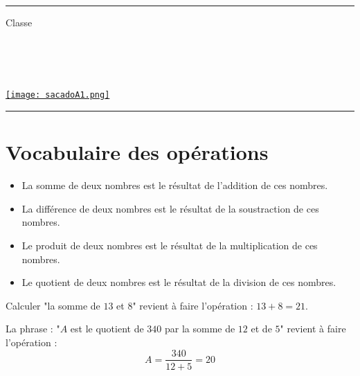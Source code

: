 \documentclass[a4paper,dvipsnames]{article}
\begin{document}

\fancyhead[C]{}
\hrule\medskip %
\begin{minipage}{0.295\textwidth} 
\raggedright
Classe \myClasse \hfill\\
\myDiscipline \hfill\\
\myParcours \hfill\\
\end{minipage}
\begin{minipage}{0.4\textwidth} 
\centering 
\scshape\huge
\textcolor{sacado_purple}{\myTitle} \\ 
\normalsize 
\end{minipage}
\begin{minipage}{0.295\textwidth} 
\raggedleft
\href{https://sacado.xyz/}{\texttt{[image: sacadoA1.png]}}
\end{minipage}
\medskip \hrule
\bigskip


\section{Vocabulaire des opérations}

\begin{Def}
\begin{itemize}
\item La somme de deux nombres est le résultat de l'addition de ces nombres.
\item La différence de deux nombres est le résultat de la soustraction de ces nombres.
\item Le produit de deux nombres est le résultat de la multiplication de ces nombres.
\item Le quotient de deux nombres est le résultat de la division de ces nombres.
\end{itemize}
\end{Def}

\begin{Ex}
Calculer "la somme de $13$ et $8$" revient à faire l'opération : $13+8=21$.
\end{Ex}

\begin{Mt}
La phrase : "$A$ est le quotient de $340$ par la somme de $12$ et de $5$" revient à faire l'opération :
\[A=\frac{340}{12+5}=20\]
\end{Mt}
\end{document}
